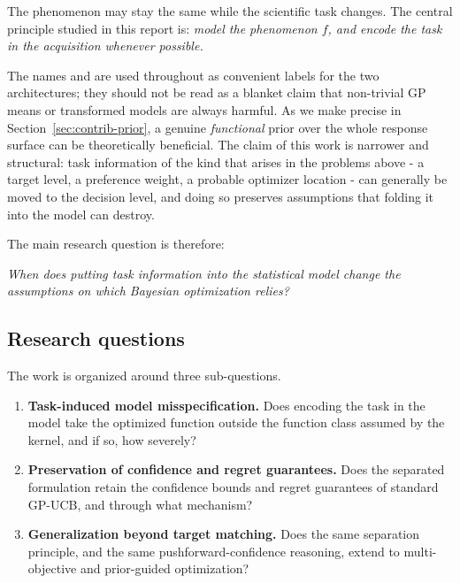 \begin{takeaway}
The phenomenon may stay the same while the scientific task changes. The
central principle studied in this report is: \emph{model the phenomenon $f$, and
encode the task in the acquisition whenever possible.}
\end{takeaway}

The names \RIGHT{} and \WRONG{} are used throughout as convenient labels for the
two architectures; they should not be read as a blanket claim that non-trivial
GP means or transformed models are always harmful. As we make precise in
Section~\ref{sec:contrib-prior}, a genuine \emph{functional} prior over the whole
response surface can be theoretically beneficial. The claim of this work is
narrower and structural: task information of the kind that arises in the problems
above - a target level, a preference weight, a probable optimizer location -
can generally be moved to the decision level, and doing so preserves assumptions
that folding it into the model can destroy.

The main research question is therefore:
\begin{center}
\emph{When does putting task information into the statistical model change the
assumptions on which Bayesian optimization relies?}
\end{center}

\subsection{Research questions}
\label{sec:intro-questions}

The work is organized around three sub-questions.
\begin{enumerate}
  \item \textbf{Task-induced model misspecification.} Does encoding the task in
        the model take the optimized function outside the function class assumed
        by the kernel, and if so, how severely?
  \item \textbf{Preservation of confidence and regret guarantees.} Does the
        separated formulation retain the confidence bounds and regret guarantees
        of standard GP-UCB, and through what mechanism?
  \item \textbf{Generalization beyond target matching.} Does the same
        separation principle, and the same pushforward-confidence reasoning,
        extend to multi-objective and prior-guided optimization?
\end{enumerate}

